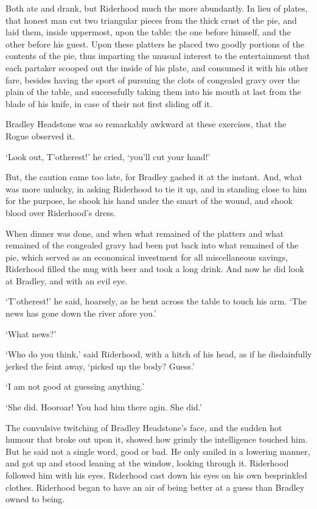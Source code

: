 Both ate and drank, but Riderhood much the more abundantly. In lieu of
plates, that honest man cut two triangular pieces from the thick crust
of the pie, and laid them, inside uppermost, upon the table: the one
before himself, and the other before his guest. Upon these platters he
placed two goodly portions of the contents of the pie, thus imparting
the unusual interest to the entertainment that each partaker scooped out
the inside of his plate, and consumed it with his other fare, besides
having the sport of pursuing the clots of congealed gravy over the plain
of the table, and successfully taking them into his mouth at last from
the blade of his knife, in case of their not first sliding off it.

Bradley Headstone was so remarkably awkward at these exercises, that the
Rogue observed it.

‘Look out, T’otherest!’ he cried, ‘you’ll cut your hand!’

But, the caution came too late, for Bradley gashed it at the instant.
And, what was more unlucky, in asking Riderhood to tie it up, and in
standing close to him for the purpose, he shook his hand under the smart
of the wound, and shook blood over Riderhood’s dress.

When dinner was done, and when what remained of the platters and what
remained of the congealed gravy had been put back into what remained of
the pie, which served as an economical investment for all miscellaneous
savings, Riderhood filled the mug with beer and took a long drink. And
now he did look at Bradley, and with an evil eye.

‘T’otherest!’ he said, hoarsely, as he bent across the table to touch
his arm. ‘The news has gone down the river afore you.’

‘What news?’

‘Who do you think,’ said Riderhood, with a hitch of his head, as if he
disdainfully jerked the feint away, ‘picked up the body? Guess.’

‘I am not good at guessing anything.’

‘She did. Hooroar! You had him there agin. She did.’

The convulsive twitching of Bradley Headstone’s face, and the sudden
hot humour that broke out upon it, showed how grimly the intelligence
touched him. But he said not a single word, good or bad. He only smiled
in a lowering manner, and got up and stood leaning at the window,
looking through it. Riderhood followed him with his eyes. Riderhood cast
down his eyes on his own besprinkled clothes. Riderhood began to have an
air of being better at a guess than Bradley owned to being.

